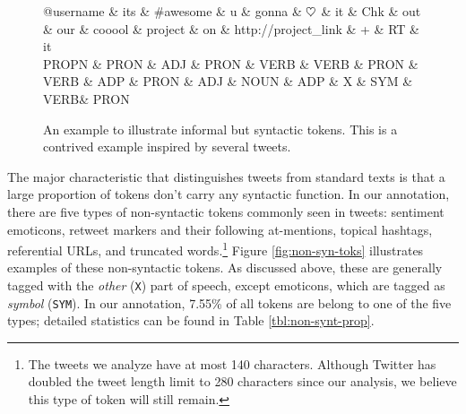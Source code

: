 \documentclass[11pt,a4paper]{article}
\newcommand{\heart}{\ensuremath\heartsuit}
\begin{document}
\begin{figure}[t]
	\centering
	\small
	\begin{dependency}[edge slant=2, text only label, label style=above]
		\begin{deptext}
			@username \& its \& \#awesome \& u \& gonna \& $\heart$ \& it \& Chk \& out \& our \& cooool \& project \& on \& http://project\_link \& + \& RT \& it\\
			\tiny PROPN \& \tiny PRON \& \tiny ADJ \& \tiny PRON \& \tiny VERB \& \tiny VERB \& \tiny PRON \& \tiny VERB \& \tiny ADP \& \tiny PRON \& \tiny ADJ \& \tiny NOUN \& \tiny ADP \& \tiny X \& \tiny SYM \& \tiny VERB\& \tiny PRON\\
		\end{deptext}
	\end{dependency}
	\caption{An example to illustrate informal but syntactic tokens.
		This is a contrived example inspired by several tweets.}\label{fig:informal-toks}
\end{figure}

The major characteristic that distinguishes tweets from standard texts is that
a large proportion of tokens don't carry any syntactic function. 
In our annotation, there are five types of non-syntactic tokens commonly seen in tweets: %
sentiment emoticons, retweet markers and their following at-mentions, topical hashtags, referential URLs, and
truncated words.\footnote{The tweets we analyze have at most 140
  characters. Although Twitter has doubled the tweet length limit to
  280 characters since our analysis, we believe this type of token
  will still remain.}  Figure \ref{fig:non-syn-toks} illustrates examples of
these non-syntactic tokens.  As discussed above, these are generally
tagged with the \emph{other} (\texttt{X}) part of speech, except
emoticons, which are tagged as \emph{symbol} (\texttt{SYM}).  In our annotation, 
7.55\% of all tokens are belong to one of the five types; detailed statistics can be found in Table \ref{tbl:non-synt-prop}.
\end{document}
